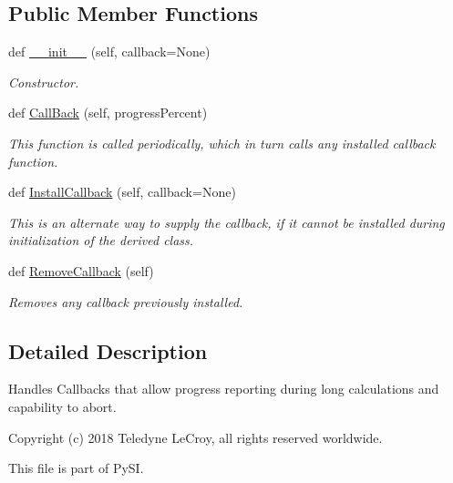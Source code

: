 \subsection*{Public Member Functions}
\begin{DoxyCompactItemize}
\item 
def \hyperlink{classSignalIntegrity_1_1CallBacker_1_1CallBacker_a5580a7fcf0bfd317a8f8c7c80eefdd69}{\+\_\+\+\_\+init\+\_\+\+\_\+} (self, callback=None)
\begin{DoxyCompactList}\small\item\em Constructor. \end{DoxyCompactList}\item 
def \hyperlink{classSignalIntegrity_1_1CallBacker_1_1CallBacker_ad1aebee41f7b067b9fc11c28f87b27ba}{Call\+Back} (self, progress\+Percent)
\begin{DoxyCompactList}\small\item\em This function is called periodically, which in turn calls any installed callback function. \end{DoxyCompactList}\item 
def \hyperlink{classSignalIntegrity_1_1CallBacker_1_1CallBacker_a9307eb7d2258b5f1df8bfc5f43effcab}{Install\+Callback} (self, callback=None)
\begin{DoxyCompactList}\small\item\em This is an alternate way to supply the callback, if it cannot be installed during initialization of the derived class. \end{DoxyCompactList}\item 
def \hyperlink{classSignalIntegrity_1_1CallBacker_1_1CallBacker_ac93a2d2ea7a87653318147244b98b31c}{Remove\+Callback} (self)
\begin{DoxyCompactList}\small\item\em Removes any callback previously installed. \end{DoxyCompactList}\end{DoxyCompactItemize}


\subsection{Detailed Description}
Handles Callbacks that allow progress reporting during long calculations and capability to abort. 

Copyright (c) 2018 Teledyne Le\+Croy, all rights reserved worldwide.

This file is part of Py\+SI.

